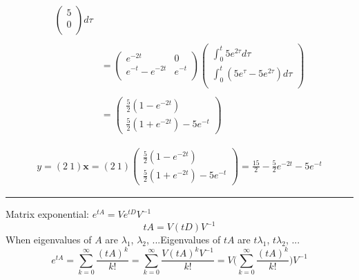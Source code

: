 \begin{ex}{}
\begin{equation*}
\begin{aligned}
\begin{pmatrix}
5\\
0\\
\end{pmatrix}d\tau\\\\
&=\begin{pmatrix}
e^{-2t} & 0\\
e^{-t}-e^{-2t} & e^{-t}\\
\end{pmatrix}
\begin{pmatrix}
\int_{0}^{t} 5e^{2\tau}d\tau\\
\int_{0}^{t} (5e^{\tau}-5e^{2\tau})d\tau\\
\end{pmatrix}\\\\
&=\begin{pmatrix}
\frac{5}{2}(1-e^{-2t})\\
\frac{5}{2}(1+e^{-2t})-5e^{-t}
\end{pmatrix}
\end{aligned}
\end{equation*}

\begin{gather*}
y = (2 \ 1)\mathbf{x} = (2 \ 1)\begin{pmatrix}
\frac{5}{2}(1-e^{-2t})\\
\frac{5}{2}(1+e^{-2t})-5e^{-t}
\end{pmatrix}
 = \frac{15}{2}-\frac{5}{2}e^{-2t}-5e^{-t}
\end{gather*}

\vspace{.3cm}\hrule\vspace{.3cm}
Matrix exponential: $e^{tA} = Ve^{tD}V^{-1}$
\[tA = V(tD)V^{-1}\]
When eigenvalues of $A$ are $\lambda_{1}$, $\lambda_{2}$, ...Eigenvalues of $tA$ are $t\lambda_{1}$, $t\lambda_{2}$, ...
\[e^{tA} = \sum^{\infty}_{k=0}\frac{(tA)^{k}}{k!} =\sum^{\infty}_{k=0}\frac{V(tA)^{k}V^{-1}}{k!} = V\bigg(\sum^{\infty}_{k=0}\frac{(tA)^{k}}{k!}\bigg)V^{-1} \]


\end{ex}
